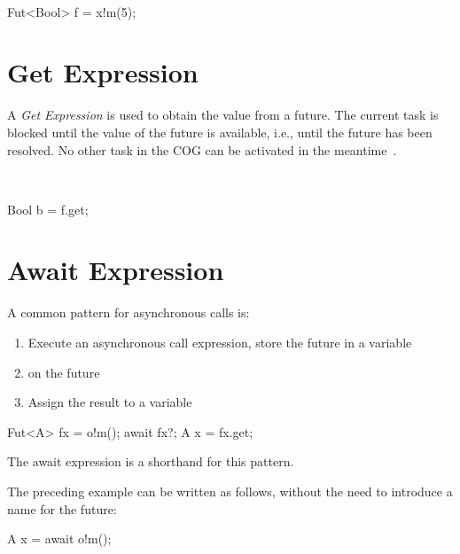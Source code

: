 \begin{abssyntax}
  {}\ \TRS{!}\ \ \TRS{(}  \TRS{)}  
\end{abssyntax}

\begin{absexample}
Fut<Bool> f = x!m(5);  
\end{absexample}

\section{Get Expression}\label{sec:getexpr}
A \emph{Get Expression} is used to obtain the value from a future.
The current task is blocked until the value of the future is available, i.e., until
the future has been resolved. No other task in the COG can be activated in
the meantime~\cite{johnsen10fmco}.

\begin{abssyntax}
  {}\ \ 
\end{abssyntax}

\begin{absexample}
Bool b = f.get;
\end{absexample}

\section{Await Expression}

A common pattern for asynchronous calls is:
\begin{enumerate}
\item Execute an asynchronous call expression, store the future in a variable
\item {} on the future
\item Assign the result to a variable
\end{enumerate}

\begin{absexample}
Fut<A> fx = o!m();
await fx?;
A x = fx.get;
\end{absexample}

The await expression is a shorthand for this pattern.

\begin{abssyntax}
  {} 
\end{abssyntax}

The preceding example can be written as follows, without the need to
introduce a name for the future:
\begin{absexample}
A x = await o!m();
\end{absexample}

